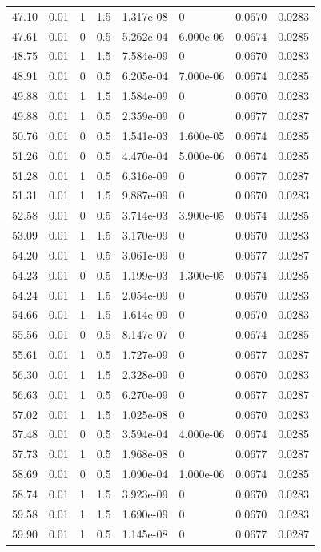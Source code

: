 \documentclass[preview]{standalone}
\begin{document}
{{{\begin{tabular}{L{1.2cm}C{1.2cm} C{0.3cm}C{0.5cm} C{1.4cm}C{1.4cm} C{1.4cm}C{1.4cm}}
  47.10  &  0.01  & 1     & 1.5 &  1.317e-08  & 0  & 0.0670 &  0.0283   \\ 
  47.61  &  0.01  & 0     & 0.5 &  5.262e-04  & 6.000e-06  & 0.0674 &  0.0285   \\ 
  48.75  &  0.01  & 1     & 1.5 &  7.584e-09  & 0  & 0.0670 &  0.0283   \\ 
  48.91  &  0.01  & 0     & 0.5 &  6.205e-04  & 7.000e-06  & 0.0674 &  0.0285   \\ 
  49.88  &  0.01  & 1     & 1.5 &  1.584e-09  & 0  & 0.0670 &  0.0283   \\ 
  49.88  &  0.01  & 1     & 0.5 &  2.359e-09  & 0  & 0.0677 &  0.0287   \\ 
  50.76  &  0.01  & 0     & 0.5 &  1.541e-03  & 1.600e-05  & 0.0674 &  0.0285   \\ 
  51.26  &  0.01  & 0     & 0.5 &  4.470e-04  & 5.000e-06  & 0.0674 &  0.0285   \\ 
  51.28  &  0.01  & 1     & 0.5 &  6.316e-09  & 0  & 0.0677 &  0.0287   \\ 
  51.31  &  0.01  & 1     & 1.5 &  9.887e-09  & 0  & 0.0670 &  0.0283   \\ 
  52.58  &  0.01  & 0     & 0.5 &  3.714e-03  & 3.900e-05  & 0.0674 &  0.0285   \\ 
  53.09  &  0.01  & 1     & 1.5 &  3.170e-09  & 0  & 0.0670 &  0.0283   \\ 
  54.20  &  0.01  & 1     & 0.5 &  3.061e-09  & 0  & 0.0677 &  0.0287   \\ 
  54.23  &  0.01  & 0     & 0.5 &  1.199e-03  & 1.300e-05  & 0.0674 &  0.0285   \\ 
  54.24  &  0.01  & 1     & 1.5 &  2.054e-09  & 0  & 0.0670 &  0.0283   \\ 
  54.66  &  0.01  & 1     & 1.5 &  1.614e-09  & 0  & 0.0670 &  0.0283   \\ 
  55.56  &  0.01  & 0     & 0.5 &  8.147e-07  & 0  & 0.0674 &  0.0285   \\ 
  55.61  &  0.01  & 1     & 0.5 &  1.727e-09  & 0  & 0.0677 &  0.0287   \\ 
  56.30  &  0.01  & 1     & 1.5 &  2.328e-09  & 0  & 0.0670 &  0.0283   \\ 
  56.63  &  0.01  & 1     & 0.5 &  6.270e-09  & 0  & 0.0677 &  0.0287   \\ 
  57.02  &  0.01  & 1     & 1.5 &  1.025e-08  & 0  & 0.0670 &  0.0283   \\ 
  57.48  &  0.01  & 0     & 0.5 &  3.594e-04  & 4.000e-06  & 0.0674 &  0.0285   \\ 
  57.73  &  0.01  & 1     & 0.5 &  1.968e-08  & 0  & 0.0677 &  0.0287   \\ 
  58.69  &  0.01  & 0     & 0.5 &  1.090e-04  & 1.000e-06  & 0.0674 &  0.0285   \\ 
  58.74  &  0.01  & 1     & 1.5 &  3.923e-09  & 0  & 0.0670 &  0.0283   \\ 
  59.58  &  0.01  & 1     & 1.5 &  1.690e-09  & 0  & 0.0670 &  0.0283   \\ 
  59.90  &  0.01  & 1     & 0.5 &  1.145e-08  & 0  & 0.0677 &  0.0287   \\ 
\hline 
\end{tabular} 

}}}
\end{document}
